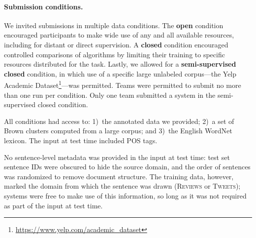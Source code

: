 \documentclass[11pt,letterpaper]{article}
\newcommand{\ensuretext}[1]{#1}
\newcommand{\nssmarker}{\ensuretext{\textcolor{magenta}{\ensuremath{^{\textsc{NS}}_{\textsc{S}}}}}}
\newcommand{\arkcomment}[3]{\ensuretext{\textcolor{#3}{[#1 #2]}}}
\newcommand{\nss}[1]{\arkcomment{\nssmarker}{#1}{magenta}}
\newcommand{\finalversion}[1]{}
\begin{document}
\paragraph{Submission conditions.}
We invited submissions in multiple data conditions. %
The \textbf{open} condition encouraged participants to make 
wide use of any and all available resources, including for 
distant or direct supervision. 
A \textbf{closed} condition encouraged controlled comparisons of algorithms 
by limiting their training to specific resources distributed for the task. 
Lastly, we allowed for a \textbf{semi-supervised closed} condition, in which 
use of a specific large unlabeled corpus---the Yelp Academic Dataset\footnote{\url{https://www.yelp.com/academic_dataset}}---was permitted.
Teams were permitted to submit no more than one run per condition.
Only one team submitted a system in the semi-supervised closed condition.

All conditions had access to: 1)~the annotated data we provided; 
2)~a set of Brown clusters \citep{brown-92} computed from a large corpus;\finalversion{\nss{specify/cite}} 
and 3)~the English WordNet lexicon. 
The input at test time included POS tags. 

No sentence-level metadata was provided in the input at test time: 
test set sentence IDs were obscured to hide the source domain, and the order of sentences was randomized 
to remove document structure.
The training data, however, marked the domain from which the sentence was drawn 
(\textsc{Reviews} or \textsc{Tweets}); systems were free to make use of this information, 
so long as it was not required as part of the input at test time.
\end{document}
